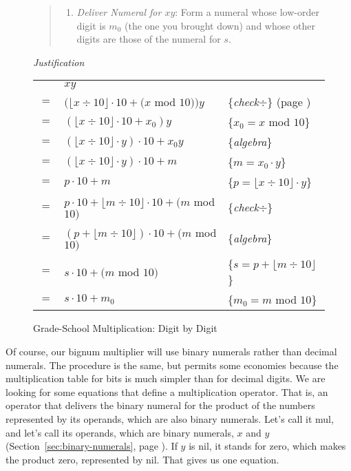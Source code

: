 \begin{figure}
\begin{quote}
\begin{enumerate}
\item \emph{Deliver Numeral for $x y$}:
Form a numeral whose low-order digit is $m_0$ (the one you brought down)
and whose other digits are those of the numeral for $s$.
\end{enumerate}
\end{quote}

\emph{Justification}
\begin{center}
\begin{tabular}{cll}
    & $x y$ & \\
$=$ & $(\lfloor x \div 10\rfloor \cdot 10 + (x$ mod $10)) y$  & \{\emph{check}$\div$\} (page \pageref{third-grade-division})\\
$=$ & $(\lfloor x \div 10\rfloor \cdot 10 + x_0) y$           & \{$x_0=x$ mod $10$\}\\
$=$ & $(\lfloor x \div 10\rfloor \cdot y) \cdot 10 + x_0 y$   & \{\emph{algebra}\} \\
$=$ & $(\lfloor x \div 10\rfloor \cdot y) \cdot 10 + m$       & \{$m=x_0\cdot y$\} \\
$=$ & $p \cdot 10 + m$                                        & \{$p=\lfloor x \div 10\rfloor \cdot y$\} \\
$=$ & $p \cdot 10 + \lfloor m \div 10 \rfloor \cdot 10 + (m$ mod $10)$& \{\emph{check}$\div$\} \\
$=$ & $(p + \lfloor m \div 10 \rfloor) \cdot 10 + (m$ mod $10)$       & \{\emph{algebra}\} \\
$=$ & $s \cdot 10 + (m$ mod $10)$                             & \{$s=p + \lfloor m \div 10 \rfloor$\} \\
$=$ & $s \cdot 10 + m_0$                                      & \{$m_0=m$ mod $10$\} \\
\end{tabular}
\end{center}
\label{multiplication!grade school}
\caption{Grade-School Multiplication: Digit by Digit}
\label{fig:grade-school-mult}
\end{figure}

Of course, our bignum multiplier
will use binary numerals rather than decimal numerals.
The procedure is the same, but permits some economies
because the multiplication table for bits is much simpler
than for decimal digits.
We are looking for some equations that define a multiplication operator.
That is, an operator that delivers the binary numeral for the product of the numbers
represented by its operands, which are also binary numerals. 
Let's call it mul, and let's call its operands, which are binary numerals,
$x$ and $y$ (Section~\ref{sec:binary-numerals}, page \pageref{sec:binary-numerals}).
If $y$ is nil, it stands for zero, which makes the product zero, represented by nil.
That gives us one equation.

